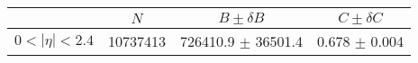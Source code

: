 \begin{tabular}{lccc}
\hline
    &   $N$   & $B \pm \delta B$  &  $C \pm \delta C$ \\
\hline
$0 < |\eta| <2.4$              & 10737413   & 726410.9   $\pm$ 36501.4 & 0.678      $\pm$ 0.004 \\
\hline
\end{tabular}
